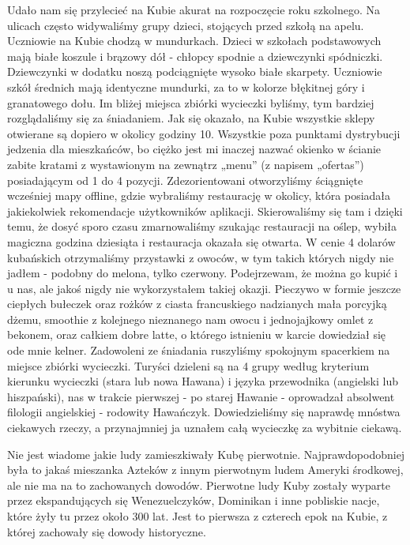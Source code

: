 \par Udało nam się przylecieć na Kubie akurat na rozpoczęcie roku szkolnego.
Na ulicach często widywaliśmy grupy dzieci, stojących przed szkołą na apelu.
Uczniowie na Kubie chodzą w mundurkach.
Dzieci w szkołach podstawowych mają białe koszule i brązowy dół - chłopcy spodnie a dziewczynki spódniczki.
Dziewczynki w dodatku noszą podciągnięte wysoko białe skarpety.
Uczniowie szkół średnich mają identyczne mundurki, za to w kolorze błękitnej góry i granatowego dołu.
Im bliżej miejsca zbiórki wycieczki byliśmy, tym bardziej rozglądaliśmy się za śniadaniem.
Jak się okazało, na Kubie wszystkie sklepy otwierane są dopiero w okolicy godziny 10.
Wszystkie poza punktami dystrybucji jedzenia dla mieszkańców, bo ciężko jest mi inaczej nazwać okienko w ścianie zabite kratami z wystawionym na zewnątrz „menu” (z napisem „ofertas”) posiadającym od 1 do 4 pozycji.
Zdezorientowani otworzyliśmy ściągnięte wcześniej mapy offline, gdzie wybraliśmy restaurację w okolicy, która posiadała jakiekolwiek rekomendacje użytkowników aplikacji.
Skierowaliśmy się tam i dzięki temu, że dosyć sporo czasu zmarnowaliśmy szukając restauracji na oślep, wybiła magiczna godzina dziesiąta i restauracja okazała się otwarta.
W cenie 4 dolarów kubańskich otrzymaliśmy przystawki z owoców, w tym takich których nigdy nie jadłem - podobny do melona, tylko czerwony.
Podejrzewam, że można go kupić i u nas, ale jakoś nigdy nie wykorzystałem takiej okazji.
Pieczywo w formie jeszcze ciepłych bułeczek oraz rożków z ciasta francuskiego nadzianych mała porcyjką dżemu, smoothie z kolejnego nieznanego nam owocu i jednojajkowy omlet z bekonem, oraz całkiem dobre latte, o którego istnieniu w karcie dowiedział się ode mnie kelner.
Zadowoleni ze śniadania ruszyliśmy spokojnym spacerkiem na miejsce zbiórki wycieczki.
Turyści dzieleni są na 4 grupy według kryterium kierunku wycieczki (stara lub nowa Hawana) i języka przewodnika (angielski lub hiszpański), nas w trakcie pierwszej - po starej Hawanie - oprowadzał absolwent filologii angielskiej - rodowity Hawańczyk.
Dowiedzieliśmy się naprawdę mnóstwa ciekawych rzeczy, a przynajmniej ja uznałem całą wycieczkę za wybitnie ciekawą.
\par Nie jest wiadome jakie ludy zamieszkiwały Kubę pierwotnie.
Najprawdopodobniej była to jakaś mieszanka Azteków z innym pierwotnym ludem Ameryki środkowej, ale nie ma na to zachowanych dowodów.
Pierwotne ludy Kuby zostały wyparte przez ekspandujących się Wenezuelczyków, Dominikan i inne pobliskie nacje, które żyły tu przez około 300 lat.
Jest to pierwsza z czterech epok na Kubie, z której zachowały się dowody historyczne.

